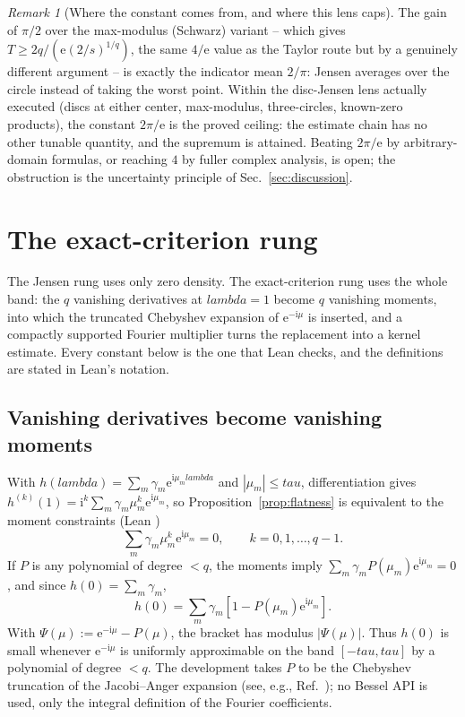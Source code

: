 \documentclass[%
  aps,
  pra,
  preprint,
  superscriptaddress,
  amsmath,amssymb,
  nofootinbib,
  floatfix,
]{revtex4-2}
\def\lambda{lambda}\def\tau{tau}\def\phi{phi}\def\alpha{alpha}%
\theoremstyle{definition}
\theoremstyle{remark}
\newtheorem{remark}[theorem]{Remark}
\newcommand{\tauvar}{\tau}
\DeclareRobustCommand{\lean}[1]{\path{#1}}
\begin{document}
\begin{remark}[Where the constant comes from, and where this lens caps]
The gain of $\pi/2$ over the max-modulus (Schwarz) variant -- which gives
$T\ge2q/(\mathrm{e}(2/s)^{1/q})$, the same $4/\mathrm{e}$ value as the Taylor route but by a genuinely
different argument -- is exactly the indicator mean $2/\pi$: Jensen averages over the
circle instead of taking the worst point. Within the disc-Jensen lens actually executed
(discs at either center, max-modulus, three-circles, known-zero products), the constant
$2\pi/\mathrm{e}$ is the proved ceiling: the estimate chain has no other tunable quantity, and the
supremum is attained. Beating $2\pi/\mathrm{e}$ by arbitrary-domain formulas, or reaching $4$ by
fuller complex analysis, is open; the obstruction is the uncertainty principle of
Sec.~\ref{sec:discussion}.
\end{remark}

\section{The exact-criterion rung}
\label{sec:newrung}

The Jensen rung uses only zero density. The exact-criterion rung uses the whole band: the
$q$ vanishing derivatives at $\lambda=1$ become $q$ vanishing moments, into which the
truncated Chebyshev expansion of $\mathrm{e}^{-\mathrm{i}\mu}$ is inserted, and a compactly supported
Fourier multiplier turns the replacement into a kernel estimate. Every constant below is the
one that Lean checks, and the definitions are stated in Lean's notation.

\subsection{Vanishing derivatives become vanishing moments}

With $h(\lambda)=\sum_m\gamma_m \mathrm{e}^{\mathrm{i}\mu_m\lambda}$ and $|\mu_m|\le\tauvar$,
differentiation gives $h^{(k)}(1)=\mathrm{i}^k\sum_m\gamma_m\mu_m^k \mathrm{e}^{\mathrm{i}\mu_m}$, so
Proposition~\ref{prop:flatness} is equivalent to the moment constraints (Lean
\lean{h_moments})
\begin{equation}
\displaystyle
\sum_m \gamma_m\mu_m^k \mathrm{e}^{\mathrm{i}\mu_m}=0,
\qquad k=0,1,\ldots,q-1.
\label{eq:moments}
\end{equation}
If $P$ is any polynomial of degree $<q$, the moments imply
$\sum_m\gamma_mP(\mu_m)\mathrm{e}^{\mathrm{i}\mu_m}=0$, and since $h(0)=\sum_m\gamma_m$,
\begin{equation}
\displaystyle
h(0)=\sum_m \gamma_m[1-P(\mu_m)\mathrm{e}^{\mathrm{i}\mu_m}].
\label{eq:replace}
\end{equation}
With $\Psi(\mu):=\mathrm{e}^{-\mathrm{i}\mu}-P(\mu)$, the bracket has modulus $|\Psi(\mu)|$. Thus $h(0)$ is
small whenever $\mathrm{e}^{-\mathrm{i}\mu}$ is uniformly approximable on the band $[-\tauvar,\tauvar]$ by a
polynomial of degree $<q$. The development takes $P$ to be the Chebyshev truncation of
the Jacobi--Anger expansion (see, e.g., Ref.~\cite{MasonHandscomb}); no Bessel API is used,
only the integral definition of the Fourier coefficients.
\end{document}
